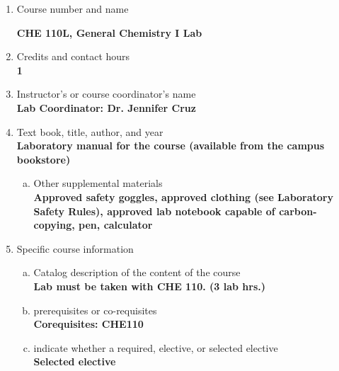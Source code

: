 \label{CHE110L}  %
\begin{enumerate}[1.]
\item Course number and name\\
  {\bfseries
CHE 110L, General Chemistry I Lab

  }

\item Credits and contact hours\\
  {\bfseries
1
  }

\item Instructor's or course coordinator's name\\
  {\bfseries
    Lab Coordinator: Dr. Jennifer Cruz
  }

\item Text book, title, author, and year\\
  {\bfseries
    Laboratory manual for the course (available from the campus bookstore)
  }
\begin{enumerate}[a.]
\item Other supplemental materials\\
  {\bfseries
  Approved safety goggles, approved clothing (see Laboratory Safety Rules), approved lab notebook capable of carbon-copying, pen, calculator
  }
\end{enumerate}

\item Specific course information
\begin{enumerate}[a.]
\item Catalog description of the content of the course\\
  {\bfseries
Lab must be taken with CHE 110. (3 lab hrs.)
  }

\item prerequisites or co-requisites\\
  {\bfseries
    Corequisites: CHE110
  }

\item indicate whether a required, elective, or selected elective\\ %
  {\bfseries
    Selected elective
  }


\end{enumerate}
\end{enumerate}
